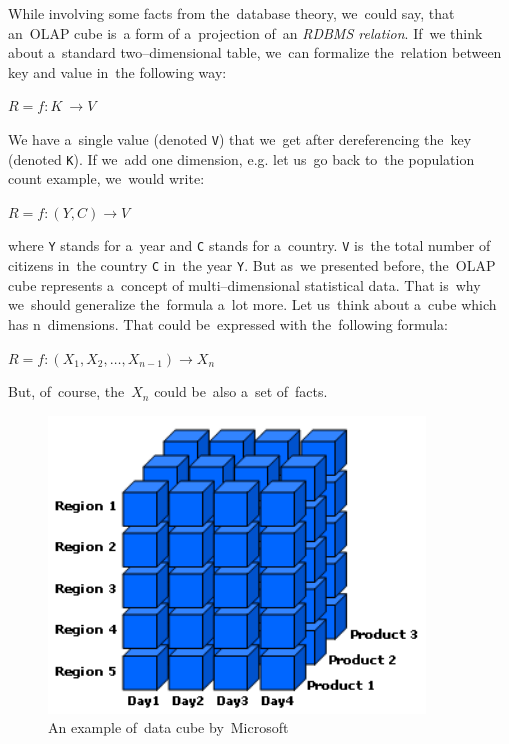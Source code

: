 While involving some facts from the~database theory, we~could say, that an~OLAP cube is~a form
of a~projection of~an \emph{RDBMS relation}. If~we think about a~standard two--dimensional table, we~can
formalize the~relation between key and value in~the following way:

\begin{center}
$R = f: K~\rightarrow V$
\end{center}

We have a~single value (denoted \texttt{V}) that we~get after dereferencing the~key (denoted \texttt{K}).
If we~add one dimension, e.g. let us~go back to~the population count example, we~would write:

\begin{center}
$R = f: (Y,C) \rightarrow V$
\end{center}

where \texttt{Y} stands for a~year and \texttt{C} stands for a~country. \texttt{V} is~the total number of
citizens in~the country \texttt{C} in~the year \texttt{Y}.
But as~we presented before, the~OLAP cube represents a~concept of
multi--dimensional statistical data. That is~why we~should generalize the~formula a~lot more.
Let us~think about a~cube which has n~dimensions. That could be~expressed with the~following
formula:

\begin{center}
$R = f: (X_{1}, X_{2}, …, X_{n-1}) \rightarrow X_{n}$
\end{center}

But, of~course, the~$X_{n}$ could be~also a~set of~facts.


\begin{figure}
	\centering
	\includegraphics[width=100mm]{img/data-cube.png}
	\caption{An example of~data cube by~Microsoft~\cite{msdn-cube}}
	\label{fig:lod-cloud}
\end{figure}

